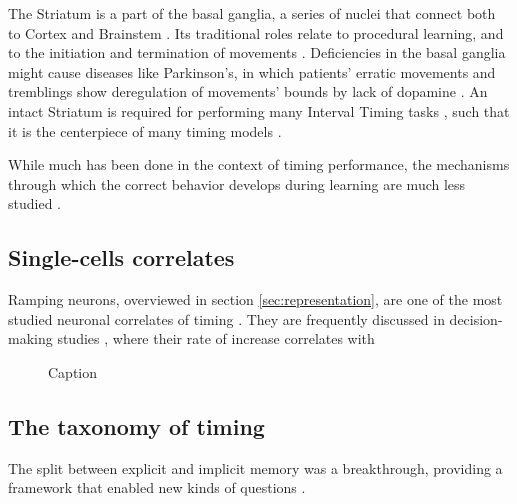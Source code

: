         The Striatum is a part of the basal ganglia, a series of nuclei that connect both to Cortex and Brainstem \cite{helie2015learning}. Its traditional roles relate to procedural learning, and to the initiation and termination of movements \cite{helie2015learning}. Deficiencies in the basal ganglia might cause diseases like Parkinson's, in which patients' erratic movements and tremblings show deregulation of movements' bounds by lack of dopamine \cite{buhusi2005makes}. An intact Striatum is required for performing many Interval Timing tasks \cite{mello2015scalable,gouvea2015striatal,cho2010differential}, such that it is the centerpiece of many timing models \cite{mello2015scalable, buhusi2005makes}.
        
        While much has been done in the context of timing performance, the mechanisms through which the correct behavior develops during learning are much less studied \cite{van20168}.


    \subsection{Single-cells correlates}
        Ramping neurons, overviewed in section \ref{sec:representation}, are one of the most studied neuronal correlates of timing \cite{}. They are frequently discussed in decision-making studies \cite{}, where their rate of increase correlates with 
        
        \begin{figure}
            \centering
            \caption{Caption}
            \label{fig:ramping_example}
        \end{figure}
    
    \subsection{The taxonomy of timing}
    \label{sub:taxonomy}
    
        The split between explicit and implicit memory was a breakthrough, providing a framework that enabled new kinds of questions \cite{paton2018neural}. %
        
